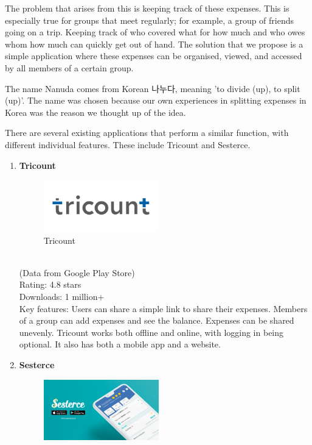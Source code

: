 \documentclass[conference]{IEEEtran}
\begin{document}
The problem that arises from this is keeping track of these expenses. This is especially true for groups that meet regularly; for example, a group of friends going on a trip. Keeping track of who covered what for how much and who owes whom how much can quickly get out of hand. The solution that we propose is a simple application where these expenses can be organised, viewed, and accessed by all members of a certain group.

The name Nanuda comes from Korean 나누다, meaning 'to divide (up), to split (up)'. The name was chosen because our own experiences in splitting expenses in Korea was the reason we thought up of the idea.

There are several existing applications that perform a similar function, with different individual features. These include Tricount and Sesterce.
\begin{enumerate}
    \item \textbf{Tricount}
        \begin{figure}[htbp]
            \centerline{\includegraphics[width=50mm,scale=0.5]{img/logo-tricount.png}}
            \caption{Tricount}
            \label{fig:tricount-logo}
        \end{figure}
        \\
        (Data from Google Play Store) \\
        Rating: 4.8 stars \\
        Downloads: 1 million+ \\
        Key features: Users can share a simple link to share their expenses. Members of a group can add expenses and see the balance. Expenses can be shared unevenly. Tricount works both offline and online, with logging in being optional. It also has both a mobile app and a website.
    \item \textbf{Sesterce}
        \begin{figure}[htbp]
            \centerline{\includegraphics[width=50mm,scale=0.5]{img/logo-sesterce.png}}

\end{figure}
\end{enumerate}
\end{document}
